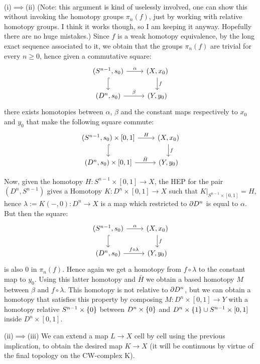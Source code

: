 \documentclass[a4paper,11pt,english]{article}
\begin{document}
\begin{exercise}[2]\ 

(i)$\implies$(ii) (Note: this argument is kind of uselessly involved, one can show this without invoking the homotopy groups $\pi_n(f)$, just by working with relative homotopy groups. I think it works though, so I am keeping it anyway. Hopefully there are no huge mistakes.) Since $f$ is a weak homotopy equivalence, by the long exact sequence associated to it, we obtain that the groups $\pi_n(f)$ are trivial for every $n\ge0$, hence given a commutative square:
\[
    \begin{tikzcd}
    (S^{n-1},s_0) \arrow[d,hook] \arrow[r,"\alpha"] & (X,x_0) \arrow[d,"f"] \\
    (D^n,s_0) \arrow[r,"\beta"] & (Y,y_0)
    \end{tikzcd}
\]
there exists homotopies between $\alpha$, $\beta$ and the constant maps respectively to $x_0$ and $y_0$ that make the following square commute:
\[
    \begin{tikzcd}
    (S^{n-1},s_0)\times[0,1] \arrow[d,hook] \arrow[r,"H"] & (X,x_0) \arrow[d,"f"] \\
    (D^n,s_0)\times[0,1] \arrow[r,"\bar H"] & (Y,y_0)
    \end{tikzcd}
\]

Now, given the homotopy $H:S^{n-1}\times[0,1]\to X$, the HEP for the pair $(D^n,S^{n-1})$ gives a Homotopy $K:D^n\times[0,1]\to X$ such that $K|_{S^{n-1}\times[0,1]}=H$, hence $\lambda:=K(-,0):D^n\to X$ is a map which restricted to $\partial D^n$ is equal to $\alpha$. But then the square:
\[
    \begin{tikzcd}
    (S^{n-1},s_0) \arrow[d,hook] \arrow[r,"\alpha"] & (X,x_0) \arrow[d,"f"] \\
    (D^n,s_0) \arrow[r,"{f\circ\lambda}"] & (Y,y_0)
    \end{tikzcd}
\]
is also $0$ in $\pi_n(f)$. Hence again we get a homotopy from $f\circ\lambda$ to the constant map to $y_0$. Using this latter homotopy and $\bar H$ we obtain a based homotopy $M$ between $\beta$ and $f\circ\lambda$. This homotopy is not relative to $\partial D^n$, but we can obtain a homotopy that satisfies this property by composing $M:D^n\times[0,1]\to Y$ with a homotopy relative $S^{n-1}\times\{0\}$ between $D^n\times\{0\}$ and $D^n\times\{1\}\cup S^{n-1}\times[0,1]$ inside $D^n\times[0,1]$.

(ii)$\implies$(iii) We can extend a map $L\to X$ cell by cell using the previous implication, to obtain the desired map $K\to X$ (it will be continuous by virtue of the final topology on the CW-complex K).


\end{exercise}
\end{document}
